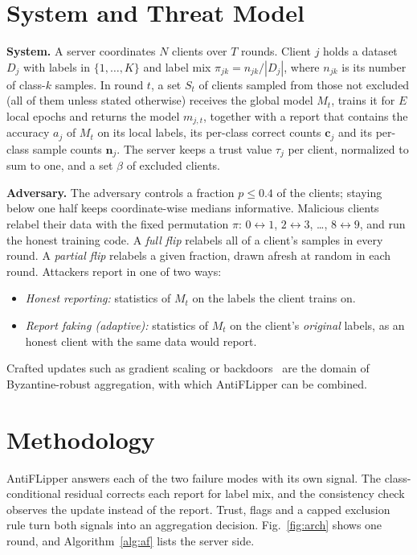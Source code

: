 \documentclass[conference]{IEEEtran}
\begin{document}
\section{System and Threat Model}
\label{sec:model}
\textbf{System.} A server coordinates $N$ clients over $T$ rounds. Client $j$ holds a dataset $D_j$ with labels in $\{1,\dots,K\}$ and label mix $\pi_{jk}=n_{jk}/|D_j|$, where $n_{jk}$ is its number of class-$k$ samples. In round $t$, a set $S_t$ of clients sampled from those not excluded (all of them unless stated otherwise) receives the global model $M_t$, trains it for $E$ local epochs and returns the model $m_{j,t}$, together with a report that contains the accuracy $a_j$ of $M_t$ on its local labels, its per-class correct counts $\mathbf{c}_j$ and its per-class sample counts $\mathbf{n}_j$. The server keeps a trust value $\tau_j$ per client, normalized to sum to one, and a set $\beta$ of excluded clients.

\textbf{Adversary.} The adversary controls a fraction $p\le 0.4$ of the clients; staying below one half keeps coordinate-wise medians informative. Malicious clients relabel their data with the fixed permutation $\pi$: $0{\leftrightarrow}1$, $2{\leftrightarrow}3$, \dots, $8{\leftrightarrow}9$, and run the honest training code. A \emph{full flip} relabels all of a client's samples in every round. A \emph{partial flip} relabels a given fraction, drawn afresh at random in each round. Attackers report in one of two ways:
\begin{itemize}
\item \emph{Honest reporting:} statistics of $M_t$ on the labels the client trains on.
\item \emph{Report faking (adaptive):} statistics of $M_t$ on the client's \emph{original} labels, as an honest client with the same data would report.
\end{itemize}
Crafted updates such as gradient scaling or backdoors~\cite{bagdasaryan2020backdoor,fang2020local} are the domain of Byzantine-robust aggregation, with which AntiFLipper can be combined.

\section{Methodology}
\label{sec:design}
AntiFLipper answers each of the two failure modes with its own signal. The class-conditional residual corrects each report for label mix, and the consistency check observes the update instead of the report. Trust, flags and a capped exclusion rule turn both signals into an aggregation decision. Fig.~\ref{fig:arch} shows one round, and Algorithm~\ref{alg:af} lists the server side.
\end{document}
